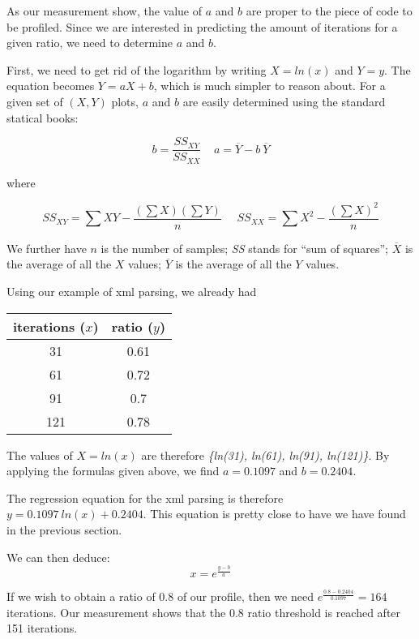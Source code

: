 \documentclass{sig-alternate}
\begin{document}
As our measurement show, the value of $a$ and $b$ are proper to the piece of code to be profiled. Since we are interested in predicting the amount of iterations for a given ratio, we need to determine $a$ and $b$. 

First, we need to get rid of the logarithm by writing $X = ln(x)$ and $Y = y$. The equation becomes $Y = a X + b$, which is much simpler to reason about. For a given set of $(X, Y)$ plots, $a$ and $b$ are easily determined using the standard statical books:

\[
b = \frac{SS_{XY}}{SS_{XX}} ~~~~~ a = \overline{Y} - b~\overline{Y}
\]

where 

\[
\textit{SS}_{XY} = \sum XY - \frac{(\sum X)(\sum Y)}{n}~~~~~~\textit{SS}_{XX} = \sum X^2 - \frac{(\sum X)^2}{n}
\]

We further have $n$ is the number of samples; 
\textit{SS} stands for ``sum of squares'';
$\overline{X}$ is the average of all the $X$ values;
$\overline{Y}$ is the average of all the $Y$ values.

Using our example of xml parsing, we already had 

\begin{center}
\begin{tabular}{|c|c|}
\hline
iterations ($x$) & ratio ($y$) \\\hline
31		& 0.61 \\
61		& 0.72\\
91		& 0.7\\
121		& 0.78\\
\hline
\end{tabular}
\end{center}

The values of $X = ln(x)$ are therefore \textit{\{ln(31), ln(61), ln(91), ln(121)\}}.
By applying the formulas given above, we find $a = 0.1097$ and $b = 0.2404$. 

The regression equation for the xml parsing is therefore $y = 0.1097~ln(x) + 0.2404$. This equation is pretty close to have we have found in the previous section.

We can then deduce:
\[
x = e^{\frac{y-b}{a}}
\]

If we wish to obtain a ratio of 0.8 of our profile, then we need $e^{\frac{0.8 - 0.2404}{0.1097}} = 164$ iterations. Our measurement shows that the 0.8 ratio threshold is reached after 151 iterations.
\end{document}
